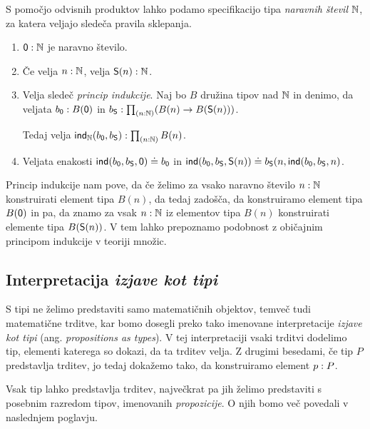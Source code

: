 \begin{primer}
  S pomočjo odvisnih produktov lahko podamo specifikacijo tipa
  \emph{naravnih števil} \(\mathbb N\), za katera veljajo sledeča pravila sklepanja.
  \begin{enumerate}
  \item \(\textnormal{\textsf{0}} : \mathbb N\) je naravno število.
  \item Če velja \(n : \mathbb N\),
    velja \(\textnormal{\textsf{S}}(n) : \mathbb N\).
  \item Velja sledeč \emph{princip indukcije}. Naj bo \(B\) družina tipov nad \(\mathbb N\) in
    denimo, da veljata \(b_{\textnormal{\textsf{0}}} : B(\textnormal{\textsf{0}})\) in
    \(b_{\textnormal{\textsf{S}}} : \textstyle \prod_{\left( n : \mathbb N \right)} (B(n) \to B(\textnormal{\textsf{S}}(n)))\).

    Tedaj velja
    \(\textnormal{\textsf{ind}}_{\mathbb N}(b_{\textnormal{\textsf{0}}}, b_{\textnormal{\textsf{S}}}) : \textstyle \prod_{\left( n : \mathbb N \right)} B(n)\).
  \item Veljata enakosti
    \label{naturals}
    \(\textnormal{\textsf{ind}}(b_{\textnormal{\textsf{0}}}, b_{\textnormal{\textsf{S}}}, \textnormal{\textsf{0}}) \doteq b_{\textnormal{\textsf{0}}}\) in
    \(\textnormal{\textsf{ind}}(b_{\textnormal{\textsf{0}}}, b_{\textnormal{\textsf{S}}}, \textnormal{\textsf{S}}(n)) \doteq
      b_{\textnormal{\textsf{S}}}(n, \textnormal{\textsf{ind}}(b_{\textnormal{\textsf{0}}}, b_{\textnormal{\textsf{S}}}, n)\).
  \end{enumerate}
  Princip indukcije nam pove, da če želimo za vsako naravno število \(n : \mathbb N\)
  konstruirati element tipa \(B(n)\), da tedaj zadošča, da konstruiramo element tipa \(B(\textnormal{\textsf{0}})\) in pa, da znamo za vsak \(n : \mathbb N\) iz elementov tipa \(B(n)\) konstruirati elemente tipa \(B(\textnormal{\textsf{S}}(n))\). V tem lahko prepoznamo podobnost z običajnim principom indukcije v teoriji množic.
\end{primer}

\subsection{Interpretacija \emph{izjave kot tipi}}

S tipi ne želimo predstaviti samo matematičnih objektov, temveč tudi matematične trditve,
kar bomo dosegli preko tako imenovane interpretacije \emph{izjave kot tipi}
(ang. \emph{propositions as types}). V tej interpretaciji vsaki trditvi dodelimo
tip, elementi katerega so dokazi, da ta trditev velja.
Z drugimi besedami, če tip \(P\) predstavlja trditev, jo tedaj dokažemo tako, da konstruiramo element \(p : P\).

Vsak tip lahko predstavlja trditev, največkrat pa jih želimo predstaviti s posebnim razredom tipov, imenovanih \emph{propozicije}. O njih bomo več povedali v naslednjem poglavju.

